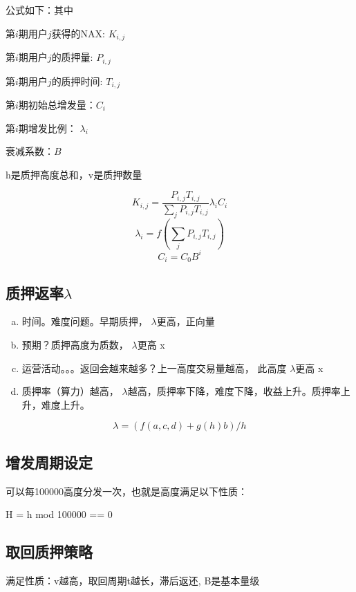 公式如下：其中

        第\(i\)期用户\(j\)获得的NAX: \(K_{i,j}\)

        第\(i\)期用户\(j\)的质押量: \(P_{i,j}\)

        第\(i\)期用户\(j\)的质押时间: \(T_{i,j}\)

        第\(i\)期初始总增发量：\(C_i\)

        第\(i\)期增发比例： \(\lambda_i\)

        衰减系数：\(B\)

        h是质押高度总和，v是质押数量

\begin{equation}
  K_{i,j} = \frac{P_{i,j} T_{i,j}}{\sum_j P_{i,j} T_{i,j}} \lambda_i C_i
\end{equation}
\begin{equation}
  \lambda_i = f(\sum_j P_{i,j} T_{i,j})
\end{equation}
\begin{equation}
  C_i = C_0 B^i
\end{equation}

\subsection{质押返率\(\lambda\)}
\begin{enumerate}[a.]
  \item 时间。难度问题。早期质押， \(\lambda\)更高，正向量
  \item 预期？质押高度为质数， \(\lambda\)更高 x
  \item 运营活动。。。返回会越来越多？上一高度交易量越高， 此高度 \(\lambda\)更高 x
  \item 质押率（算力）越高， \(\lambda\)越高，质押率下降，难度下降，收益上升。质押率上升，难度上升。
\end{enumerate}

\begin{equation}
\lambda = (f(a, c, d) + g(h) b) / h
\end{equation}

\subsection{增发周期设定}
可以每100000高度分发一次，也就是高度满足以下性质：

H = h mod 100000 == 0

\subsection{取回质押策略}
满足性质：v越高，取回周期t越长，滞后返还, B是基本量级

